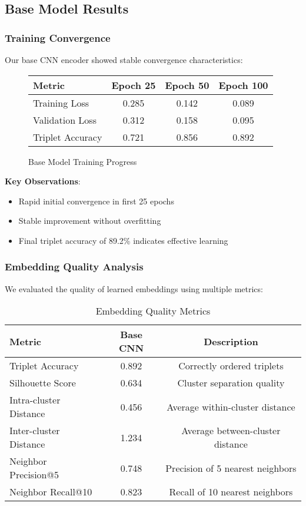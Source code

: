 \subsection{Base Model Results}

\subsubsection{Training Convergence}

Our base CNN encoder showed stable convergence characteristics:

\begin{figure}[H]
\centering
\begin{tabular}{|l|c|c|c|}
\hline
\textbf{Metric} & \textbf{Epoch 25} & \textbf{Epoch 50} & \textbf{Epoch 100} \\
\hline
Training Loss & 0.285 & 0.142 & 0.089 \\
Validation Loss & 0.312 & 0.158 & 0.095 \\
Triplet Accuracy & 0.721 & 0.856 & 0.892 \\
\hline
\end{tabular}
\caption{Base Model Training Progress}
\end{figure}

\textbf{Key Observations}:
\begin{itemize}
    \item Rapid initial convergence in first 25 epochs
    \item Stable improvement without overfitting
    \item Final triplet accuracy of 89.2\% indicates effective learning
\end{itemize}

\subsubsection{Embedding Quality Analysis}

We evaluated the quality of learned embeddings using multiple metrics:

\begin{table}[H]
\centering
\caption{Embedding Quality Metrics}
\begin{tabular}{|l|c|c|}
\hline
\textbf{Metric} & \textbf{Base CNN} & \textbf{Description} \\
\hline
Triplet Accuracy & 0.892 & Correctly ordered triplets \\
Silhouette Score & 0.634 & Cluster separation quality \\
Intra-cluster Distance & 0.456 & Average within-cluster distance \\
Inter-cluster Distance & 1.234 & Average between-cluster distance \\
Neighbor Precision@5 & 0.748 & Precision of 5 nearest neighbors \\
Neighbor Recall@10 & 0.823 & Recall of 10 nearest neighbors \\
\hline
\end{tabular}
\end{table}

